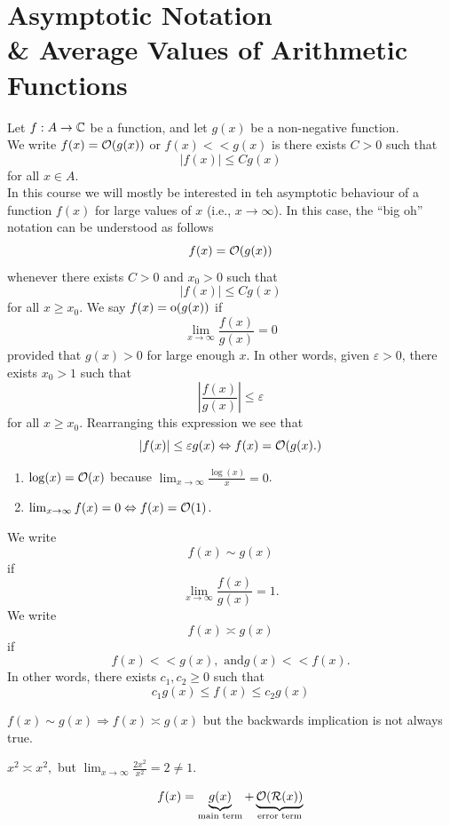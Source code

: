 \documentclass[twoside, openright, fontsize=10pt, headings=big]{scrbook}
\begin{document}
\chapter{Asymptotic Notation \\\& Average Values of Arithmetic Functions}
Let $f:A\to\mathbb{C}$ be a function, and let $g(x)$ be a non-negative function.\\
We write $f(x)=\mathcal{O}(g(x))$ or $f(x)<<g(x)$ is there exists $C>0$ such that
\[
    |f(x)|\leq Cg(x)
\]
for all $x\in A$.\\
In this course we will mostly be interested in teh asymptotic behaviour of a function $f(x)$ for large values of $x$ (i.e., $x\to\infty$). In this case, the ``big oh'' notation can be understood as follows
\[
    f(x)=\mathcal{O}(g(x))
\]
whenever there exists $C>0$ and $x_0>0$ such that
\[
    |f(x)|\leq Cg(x)
\]
for all $x\geq x_0$.
We say $f(x)=\text{o}(g(x))$ if 
\[
    \lim_{x\to\infty}\frac{f(x)}{g(x)}=0
\] provided that $g(x)>0$ for large enough $x$.
In other words, given $\varepsilon>0$, there exists $x_0>1$ such that 
\[
    \left|\frac{f(x)}{g(x)}\right|\leq \varepsilon
\]
for all $x\geq x_0$.
Rearranging this expression we see that 
\[
    |f(x)|\leq \varepsilon g(x)\Leftrightarrow f(x)=\mathcal{O}(g(x).)
\]
\begin{example}{}{}
    \begin{enumerate}
        \item $\log(x)=\mathcal{O}(x)$ because $\lim_{x\to\infty}\frac{\log(x)}{x}=0$.
        \item $\operatorname*{lim}_{x\to\infty}f(x)=0\Leftrightarrow f(x)=\mathcal{O}(1)$. 
    \end{enumerate}
\end{example}
We write
\[
    f(x)\sim g(x)
\]
if 
\[
    \lim_{x\to\infty}\frac{f(x)}{g(x)}=1.
\]
We write 
\[
    f(x)\asymp g(x)
\]
if
\[
    f(x)<<g(x),\text{ and} g(x)<<f(x).
\]
In other words, there exists $c_1,c_2\geq 0$ such that
\[
    c_1g(x)\leq f(x)\leq c_2g(x)
\]
\begin{remark}
    $f(x)\sim g(x) \Rightarrow f(x)\asymp g(x)$ but the backwards implication is not always true.
\end{remark}
\begin{example}{}{}
    $x^2\asymp x^2,$ but $\lim_{x\to\infty}\frac{2x^2}{x^2}=2\neq1.$
\end{example}
\[
    f(x)=\underbrace{g(x)}_{\text{main term}}+\underbrace{\mathcal{O}(\mathcal{R}(x))}_{\text{error term}}
\]
\end{document}

